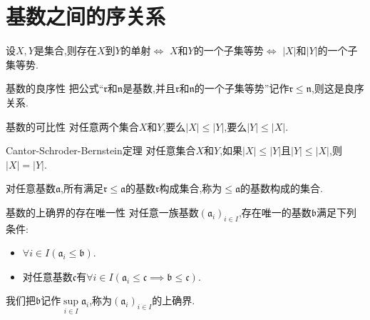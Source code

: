 \section{基数之间的序关系}

\begin{proposition}{}{}
	设$X,Y$是集合,则存在$X$到$Y$的单射$\iff$ $X$和$Y$的一个子集等势$\iff$ $\left|X\right|$和$\left|Y\right|$的一个子集等势.
\end{proposition}

\begin{theorem}{基数的良序性}{}
	把公式``$\mathfrak{r}$和$\mathfrak{n}$是基数,并且$\mathfrak{r}$和$\mathfrak{n}$的一个子集等势''记作$\mathfrak{r}\leq\mathfrak{n}$,则这是良序关系.
\end{theorem}

\begin{corollary}{基数的可比性}{}
	对任意两个集合$X$和$Y$,要么$\left|X\right|\leq\left|Y\right|$,要么$\left|Y\right|\leq\left|X\right|$.
\end{corollary}

\begin{corollary}{Cantor-Schroder-Bernstein定理}{}
	对任意集合$X$和$Y$,如果$\left|X\right|\leq\left|Y\right|$且$\left|Y\right|\leq\left|X\right|$,则$\left|X\right|=\left|Y\right|$.
\end{corollary}

\begin{remark}{}{}
	对任意基数$\mathfrak{a}$,所有满足$\mathfrak{r}\leq\mathfrak{a}$的基数$\mathfrak{r}$构成集合,称为$\leq\mathfrak{a}$的基数构成的集合.
\end{remark}

\begin{proposition}{基数的上确界的存在唯一性}{}
	对任意一族基数$\left(\mathfrak{a}_{i}\right)_{i\in I}$,存在唯一的基数$\mathfrak{b}$满足下列条件:
	\begin{itemize}
		\item $\forall i\in I\left(\mathfrak{a}_{i}\leq\mathfrak{b}\right)$.
		\item 对任意基数$\mathfrak{c}$有$\forall i\in I\left(\mathfrak{a}_{i}\leq\mathfrak{c}\implies\mathfrak{b}\leq\mathfrak{c}\right)$.
	\end{itemize}
	我们把$\mathfrak{b}$记作$\sup\limits_{i\in I}\mathfrak{a}_{i}$,称为$\left(\mathfrak{a}_{i}\right)_{i\in I}$的上确界.
\end{proposition}

